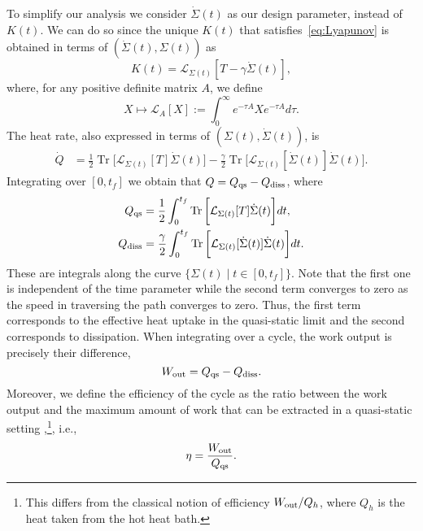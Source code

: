 \documentclass[
 reprint,
superscriptaddress,
 amsmath,amssymb,prl
 aps
]{revtex4-2}
\newcommand{\op}[1]{\operatorname{#1}}
\newcommand{\trace}{\op{Tr}}
\newcommand{\Lyap}{\mathcal{L}}
\begin{document}
To simplify our analysis we consider $\dot{\Sigma}(t)$ as our design parameter, instead of $K(t)$. We can do so since the unique $K(t)$ that satisfies~\eqref{eq:Lyapunov} is obtained in terms of $(\dot\Sigma(t),\Sigma(t))$ as
\begin{equation*}
    K(t) =
     \Lyap_{\Sigma(t)}[T - \gamma \dot{\Sigma}(t)],
\end{equation*}
where, for any positive definite matrix $A$, we define
\[
X \mapsto \Lyap_A[X]:=\int_0^\infty   e^{-\tau A} Xe^{-\tau A}d\tau.
\]
The heat rate, also expressed in terms of 
 $(\Sigma(t),\dot{\Sigma}(t))$, is
\begin{align*}
      \dot{Q}&=\frac{1}{2}\trace\bigg[\Lyap_{\Sigma(t)}[T]\dot\Sigma(t) \bigg]-\frac{\gamma}{2}\trace\bigg[\Lyap_{\Sigma(t)}[\dot \Sigma(t)]\dot\Sigma(t)\bigg].
\end{align*}
Integrating over $[0,t_f]$ we obtain that
    $
    Q = Q_{\rm qs} - Q_{\rm diss}
    $,
where
\begin{subequations}\label{eq:tot-heat}
\begin{align}
      Q_{\rm qs}&=\frac{1}{2}\int_0^{t_f} \trace\bigg[\Lyap_{\Sigma(t)}[T]\dot\Sigma(t) \bigg] d t,\\
      Q_{\rm diss} &= \frac{\gamma}{2} \int_0^{t_f}\trace\bigg[\Lyap_{\Sigma(t)}[\dot \Sigma(t)]\dot\Sigma(t)\bigg]dt.
\end{align}
\end{subequations}
These are integrals along the curve $\{\Sigma(t)\mid t\in[0,t_f]\}$. Note that the first one is independent of the time parameter while the second term converges to zero as the speed in traversing the path converges to zero. Thus, the first term corresponds to the effective heat uptake in the quasi-static limit and the second corresponds to dissipation.
When integrating over a cycle, the  work output is precisely their difference,
\begin{equation*}\label{eq:workout}
    W_{\rm out} = Q_{\rm qs} - Q_{\rm diss}.
\end{equation*}
Moreover, we define the efficiency of the cycle as the ratio between the work output and the maximum amount of work that can be extracted in a quasi-static setting \cite{Bradner2020geom},\footnote{This differs from the classical notion of efficiency $W_{\rm out}/Q_h$, where $Q_h$ is the heat taken from the hot heat bath.}, i.e.,
\[
\eta = \frac{W_{\rm out}}{Q_{\rm qs}}.
\]
\end{document}
